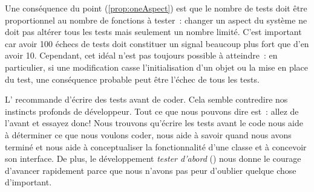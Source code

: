 \documentclass[a4paper,10pt,twoside]{book}
\begin{document}
Une conséquence du point (\ref{prop:oneAspect}) est que le nombre de tests doit être proportionnel 
au nombre de fonctions à tester~: changer un aspect du système ne doit pas altérer tous les tests 
mais seulement un nombre limité. C'est important car avoir 100 échecs de tests doit constituer 
un signal beaucoup plus fort que d'en avoir 10. Cependant, cet idéal n'est pas toujours possible 
à atteindre~: en particulier, si une modification casse l'initialisation d'un objet ou la mise 
en place du test, une conséquence probable peut être l'échec de tous les tests.

L' recommande d'écrire des tests avant de
coder. Cela semble contredire nos instincts profonds de
développeur. Tout ce que nous pouvons dire est~: allez de l'avant et
essayez donc! Nous trouvons qu'écrire les tests avant le code nous 
aide à déterminer ce que nous voulons coder, nous aide à savoir quand 
nous avons terminé et nous aide à conceptualiser la fonctionnalité 
d'une classe et à concevoir son interface.
De plus, le développement \flqq{}\emph{tester d'abord}\frqq{} () 
nous donne le courage d'avancer rapidement parce que nous n'avons pas peur 
d'oublier quelque chose d'important. 

\end{document}
